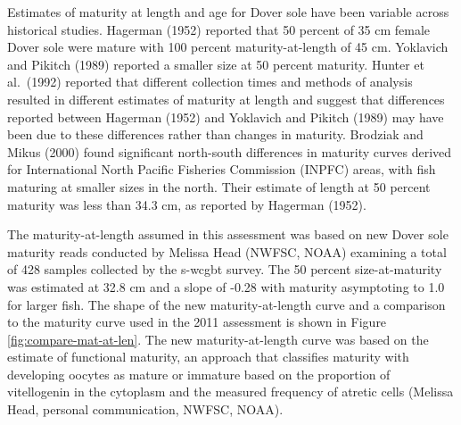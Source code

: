 \documentclass[11pt,
  english,
  a4paper,
]{article}
\begin{document}
Estimates of maturity at length and age for Dover sole have been variable across historical studies. Hagerman {(1952)\leavevmode\tagmcend\tagstructend} reported that 50 percent of 35 cm female Dover sole were mature with 100 percent maturity-at-length of 45 cm. Yoklavich and Pikitch {(1989)\leavevmode\tagmcend\tagstructend} reported a smaller size at 50 percent maturity. Hunter et al.~{(1992)\leavevmode\tagmcend\tagstructend} reported that different collection times and methods of analysis resulted in different estimates of maturity at length and suggest that differences reported between Hagerman {(1952)\leavevmode\tagmcend\tagstructend} and Yoklavich and Pikitch {(1989)\leavevmode\tagmcend\tagstructend} may have been due to these differences rather than changes in maturity. Brodziak and Mikus {(2000)\leavevmode\tagmcend\tagstructend} found significant north-south differences in maturity curves derived for International North Pacific Fisheries Commission (INPFC) areas, with fish maturing at smaller sizes in the north. Their estimate of length at 50 percent maturity was less than 34.3 cm, as reported by Hagerman {(1952)\leavevmode\tagmcend\tagstructend}.

\leavevmode\tagmcend\tagstructend\par


The maturity-at-length assumed in this assessment was based on new Dover sole maturity reads conducted by Melissa Head (NWFSC, NOAA) examining a total of 428 samples collected by the \gls{s-wcgbt} survey. The 50 percent size-at-maturity was estimated at 32.8 cm and a slope of -0.28 with maturity asymptoting to 1.0 for larger fish. The shape of the new maturity-at-length curve and a comparison to the maturity curve used in the 2011 assessment is shown in Figure \ref{fig:compare-mat-at-len}. The new maturity-at-length curve was based on the estimate of functional maturity, an approach that classifies maturity with developing oocytes as mature or immature based on the proportion of vitellogenin in the cytoplasm and the measured frequency of atretic cells (Melissa Head, personal communication, NWFSC, NOAA).
\end{document}
